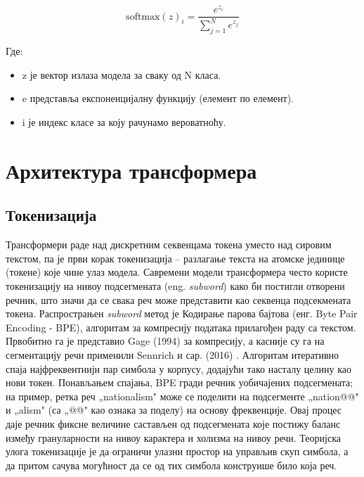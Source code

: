 \documentclass[a4paper, 12pt, master, utf8]{etf}
\begin{document}
\begin{equation}
    \label{eq:ss}
    \text{softmax}(z)_i = \frac{e^{z_i}}{\sum_{j=1}^{N} e^{z_j}}
\end{equation}

Где:

\begin{itemize}
    \item z је вектор излаза модела за сваку од N класа.
    \item e представља експоненцијалну функцију (елемент по елемент).
    \item i је индекс класе за коју рачунамо вероватноћу.
\end{itemize}

\section{Архитектура трансформера}
\label{sec:transformer}

\subsection{Токенизација}

Трансформери раде над дискретним секвенцама токена уместо над сировим текстом, па је први корак токенизација -- разлагање текста на атомске јединице (токене) које чине улаз модела. Савремени модели трансформера често користе токенизацију на нивоу подсегмената (eng. \textit{subword}) како би постигли отворени речник, што значи да се свака реч може представити као секвенца подсекмената токена. Распрострањен \textit{subword} метод је Кодирање парова бајтова (енг. Byte Pair Encoding - BPE), алгоритам за компресију података прилагођен раду са текстом. Првобитно га је представио Gage (1994) за компресију, а касније су га на сегментацију речи применили Sennrich и сар. (2016) \cite{gage_new_1994,sennrich_neural_2016}. Алгоритам итеративно спаја најфреквентнији пар симбола у корпусу, додајући тако насталу целину као нови токен. Понављањем спајања, BPE гради речник уобичајених подсегмената; на пример, ретка реч „nationalism" може се поделити на подсегменте „nation@@" и „alism" (са „@@" као ознака за поделу) на основу фреквенције. Овај процес даје речник фиксне величине састављен од подсегмената које постижу баланс између грануларности на нивоу карактера и холизма на нивоу речи. Теоријска улога токенизације је да ограничи улазни простор на управљив скуп симбола, а да притом сачува могућност да се од тих симбола конструише било која реч.
\end{document}
